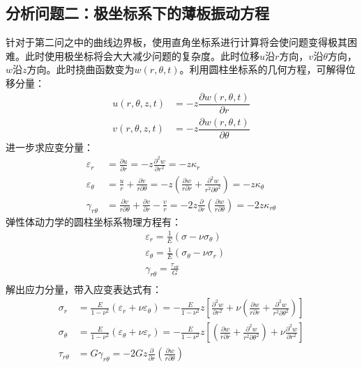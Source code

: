 \documentclass[withoutpreface,bwprint]{cumcmthesis} %
\begin{document}
\subsection{分析问题二：极坐标系下的薄板振动方程}
针对于第二问之中的曲线边界板，使用直角坐标系进行计算将会使问题变得极其困难。此时使用极坐标将会大大减少问题的复杂度。此时位移$u$沿$r$方向，$v$沿$\theta$方向，$w$沿$z$方向。此时挠曲函数变为$w(r,\theta,t)$。利用圆柱坐标系的几何方程，可解得位移分量：
\begin{equation}
    \begin{aligned}
        u(r,\theta,z,t)&=-z\dfrac{\partial w(r,\theta,t)}{\partial r}\\
        v(r,\theta,z,t)&=-z\dfrac{\partial w(r,\theta,t)}{\partial \theta}
    \end{aligned}
\end{equation}    
进一步求应变分量：
	\begin{equation}
        \begin{aligned}
	\varepsilon_r&=\frac{\partial u}{\partial r}=-z\frac{\partial^2w}{\partial r^2}=-z\kappa_r\\       
	\varepsilon_\theta&=\frac{u}{r}+\frac{\partial v}{r \partial\theta}=-z(\frac{\partial w }{r\partial r}+\frac{\partial^2 w}{r^2 \partial \theta^2})=-z\kappa_\theta\\
	\gamma_{r\theta}&=\frac{\partial v}{r\partial \theta}+\frac{\partial v}{\partial r}-\frac{v}{r}=-2z\frac{\partial}{\partial r}(\frac{\partial w}{r \partial \theta})=-2z\kappa_{r\theta}
           \end{aligned}
		\end{equation}
弹性体动力学的圆柱坐标系物理方程有：
	\begin{equation}
		\begin{aligned} 
			&\varepsilon_r=\frac{1}{E}(\sigma-\nu\sigma_\theta)\\
			&\varepsilon_\theta=\frac{1}{E}(\sigma_\theta-\nu\sigma_r)\\
			&\gamma_{r\theta}=\frac{\tau_{r\theta}}{G}\\
		\end{aligned}
	\end{equation}
	解出应力分量，带入应变表达式有：
	\begin{equation}
 \begin{aligned}
		\sigma_r&=\frac{E}{1-\nu^2}(\varepsilon_r+\nu\varepsilon_\theta)=-\frac{E}{1-\nu^2}z[\frac{\partial^2w}{\partial r^2}+\nu(\frac{\partial w}{r\partial r}+\frac{\partial^2 w}{r^2\partial \theta^2})]\\
     \sigma_\theta&=\frac{E}{1-\nu^2}(\varepsilon_\theta+\nu\varepsilon_r)=-\frac{E}{1-\nu^2}z[(\frac{\partial w}{r\partial r}+\frac{\partial^2 w}{r^2\partial \theta^2})+\nu\frac{\partial^2 w}{\partial r^2}]\\
	\tau_{r\theta}&=G\gamma_{r\theta}=-2Gz\frac{\partial }{\partial r}(\frac{\partial w}{r \partial \theta})
  \end{aligned}
	\end{equation}
\end{document}
